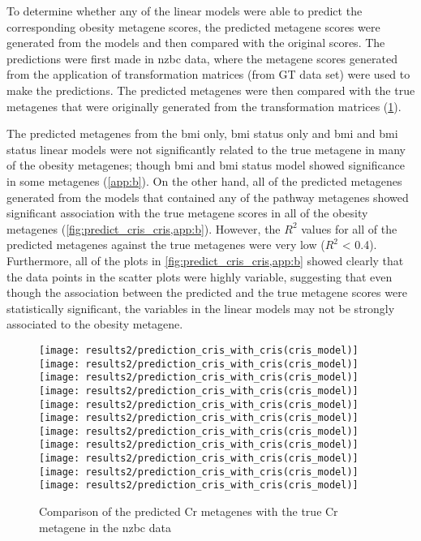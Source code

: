 To determine whether any of the linear models were able to predict the corresponding obesity metagene scores, the predicted metagene scores were generated from the models and then compared with the original scores.
The predictions were first made in \gls{nzbc} data, where the metagene scores generated from the application of transformation matrices (from GT data set) were used to make the predictions.
The predicted metagenes were then compared with the true metagenes that were originally generated from the transformation matrices (\cref{fig:predict_cris_cris}).

The predicted metagenes from the \gls{bmi} only, \gls{bmi} status only and \gls{bmi} and \gls{bmi} status linear models were not significantly related to the true metagene in many of the obesity metagenes; though \gls{bmi} and \gls{bmi} status model showed significance in some metagenes (\cref{app:b}).
On the other hand, all of the predicted metagenes generated from the models that contained any of the pathway metagenes showed significant association with the true metagene scores in all of the obesity metagenes (\cref{fig:predict_cris_cris,app:b}).
However, the $R^2$ values for all of the predicted metagenes against the true metagenes were very low ($R^2$ \textless{} 0.4).
Furthermore, all of the plots in \cref{fig:predict_cris_cris,app:b} showed clearly that the data points in the scatter plots were highly variable, suggesting that even though the association between the predicted and the true metagene scores were statistically significant, the variables in the linear models may not be strongly associated to the obesity metagene.

\begin{figure}[htpb]
	\centering
	\texttt{[image: results2/prediction\_cris\_with\_cris(cris\_model)]}
	\texttt{[image: results2/prediction\_cris\_with\_cris(cris\_model)]}
	\texttt{[image: results2/prediction\_cris\_with\_cris(cris\_model)]}
	\texttt{[image: results2/prediction\_cris\_with\_cris(cris\_model)]}
	\texttt{[image: results2/prediction\_cris\_with\_cris(cris\_model)]}
	\texttt{[image: results2/prediction\_cris\_with\_cris(cris\_model)]}
	\texttt{[image: results2/prediction\_cris\_with\_cris(cris\_model)]}
	\texttt{[image: results2/prediction\_cris\_with\_cris(cris\_model)]}
	\texttt{[image: results2/prediction\_cris\_with\_cris(cris\_model)]}
	\texttt{[image: results2/prediction\_cris\_with\_cris(cris\_model)]}
	\texttt{[image: results2/prediction\_cris\_with\_cris(cris\_model)]}
	\caption{Comparison of the predicted Cr metagenes with the true Cr metagene in the \gls{nzbc} data}
	\label{fig:predict_cris_cris}
\end{figure}

